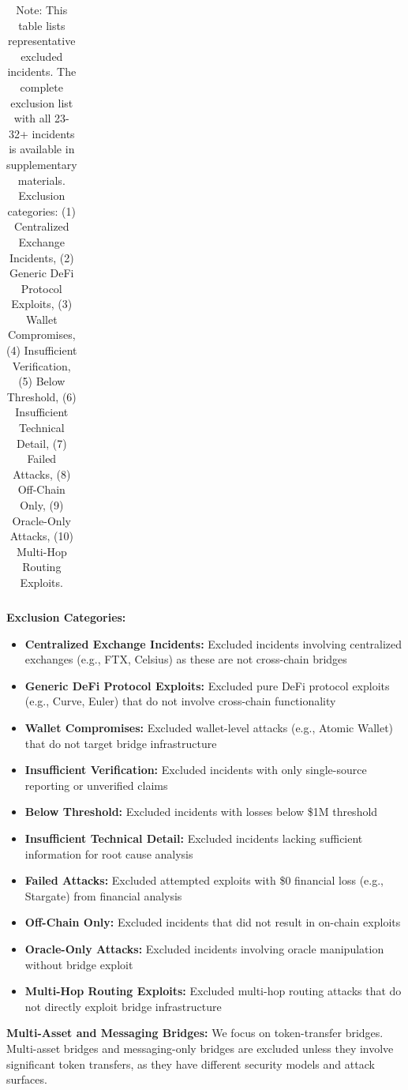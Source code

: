 \documentclass[runningheads]{llncs}
\begin{document}
\begin{table}[!ht]
\begin{tabular}{lccp{5cm}}
        \bottomrule
    \end{tabular}
    \caption*{\footnotesize Note: This table lists representative excluded incidents. The complete exclusion list with all 23-32+ incidents is available in supplementary materials. Exclusion categories: (1) Centralized Exchange Incidents, (2) Generic DeFi Protocol Exploits, (3) Wallet Compromises, (4) Insufficient Verification, (5) Below Threshold, (6) Insufficient Technical Detail, (7) Failed Attacks, (8) Off-Chain Only, (9) Oracle-Only Attacks, (10) Multi-Hop Routing Exploits.}
\end{table}

\textbf{Exclusion Categories:}
\begin{itemize}
    \item \textbf{Centralized Exchange Incidents:} Excluded incidents involving centralized exchanges (e.g., FTX, Celsius) as these are not cross-chain bridges
    \item \textbf{Generic DeFi Protocol Exploits:} Excluded pure DeFi protocol exploits (e.g., Curve, Euler) that do not involve cross-chain functionality
    \item \textbf{Wallet Compromises:} Excluded wallet-level attacks (e.g., Atomic Wallet) that do not target bridge infrastructure
    \item \textbf{Insufficient Verification:} Excluded incidents with only single-source reporting or unverified claims
    \item \textbf{Below Threshold:} Excluded incidents with losses below \$1M threshold
    \item \textbf{Insufficient Technical Detail:} Excluded incidents lacking sufficient information for root cause analysis
    \item \textbf{Failed Attacks:} Excluded attempted exploits with \$0 financial loss (e.g., Stargate) from financial analysis
    \item \textbf{Off-Chain Only:} Excluded incidents that did not result in on-chain exploits
    \item \textbf{Oracle-Only Attacks:} Excluded incidents involving oracle manipulation without bridge exploit
    \item \textbf{Multi-Hop Routing Exploits:} Excluded multi-hop routing attacks that do not directly exploit bridge infrastructure
\end{itemize}

\textbf{Multi-Asset and Messaging Bridges:} We focus on token-transfer bridges. Multi-asset bridges and messaging-only bridges are excluded unless they involve significant token transfers, as they have different security models and attack surfaces.
\end{document}
